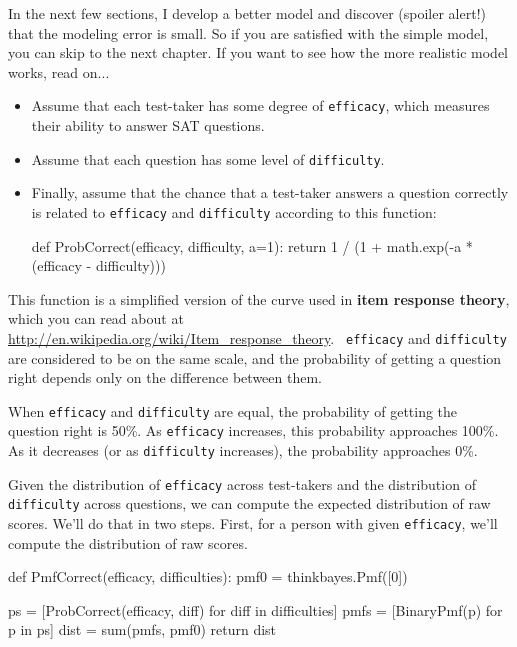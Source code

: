 \documentclass[12pt]{book}
\theoremstyle{exercise}
\begin{document}
In the next few sections, I develop a better model and 
discover (spoiler alert!) that the modeling error is small.  So if
you are satisfied with the simple model, you can skip to the next
chapter.  If you want to see how the more realistic model works,
read on...

\begin{itemize}

\item Assume that each test-taker has some 
  degree of {\tt efficacy}, which measures their
  ability to answer SAT questions.

\item Assume that each question has some level of
  {\tt difficulty}.

\item Finally, assume that the chance that a test-taker answers a
  question correctly is related to {\tt efficacy} and {\tt difficulty}
  according to this function:

\begin{code}
def ProbCorrect(efficacy, difficulty, a=1):
    return 1 / (1 + math.exp(-a * (efficacy - difficulty)))
\end{code}

\end{itemize}

This function is a simplified version of the curve used in {\bf item
response theory}, which you can read about at
\url{http://en.wikipedia.org/wiki/Item_response_theory}.  {\tt
  efficacy} and {\tt difficulty} are considered to be on the same
scale, and the probability of getting a question right depends only on
the difference between them.

When {\tt efficacy} and {\tt difficulty} are equal, the
probability of getting the question right is 50\%.  As
{\tt efficacy} increases, this probability approaches 100\%.
As it decreases (or as {\tt difficulty} increases), the
probability approaches 0\%.

Given the distribution of {\tt efficacy} across test-takers
and the distribution of {\tt difficulty} across questions, we
can compute the expected distribution of raw scores.  We'll do that
in two steps.  First, for a person with given {\tt efficacy},
we'll compute the distribution of raw scores.

\begin{code}
def PmfCorrect(efficacy, difficulties):
    pmf0 = thinkbayes.Pmf([0])

    ps = [ProbCorrect(efficacy, diff) for diff in difficulties]
    pmfs = [BinaryPmf(p) for p in ps]
    dist = sum(pmfs, pmf0)
    return dist
\end{code}
\end{document}
